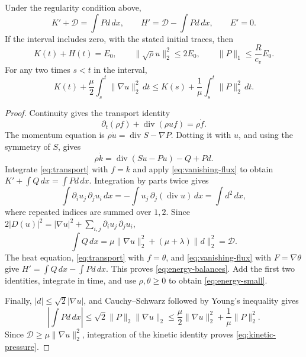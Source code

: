 \documentclass[10pt,twoside]{article}
\newcommand{\dd}{\,dx}
\newcommand{\dt}{\,dt}
\newcommand{\Div}{\operatorname{div}}
\newcommand{\norm}[2]{\lVert#1\rVert_{#2}}
\begin{document}
\begin{proposition}\label{prop:physical-energy}
Under the regularity condition above,
\begin{equation}\label{eq:energy-balances}
 K'+\mathcal D=\int Pd\dd,\qquad
 H'=\mathcal D-\int Pd\dd,\qquad E'=0.
\end{equation}
If the interval includes zero, with the stated initial traces, then
\begin{equation}\label{eq:energy-small}
 K(t)+H(t)=E_0,\qquad
 \norm{\sqrt\rho u}{2}^2\le2E_0,\qquad
 \norm{P}{1}\le\frac{R}{c_v}E_0.
\end{equation}
For any two times $s<t$ in the interval,
\begin{equation}\label{eq:kinetic-pressure}
 K(t)+\frac{\mu}{2}\int_s^t\norm{\nabla u}{2}^2\dt
 \le K(s)+\frac1\mu\int_s^t\norm{P}{2}^2\dt.
\end{equation}
\end{proposition}
\begin{proof}
Continuity gives the transport identity
\begin{equation}\label{eq:transport}
 \partial_t(\rho f)+\Div(\rho uf)=\rho\dot f.
\end{equation}
The momentum equation is $\rho\dot u=\Div S-\nabla P$.
Dotting it with $u$, and using the symmetry of $S$, gives
\begin{equation}\label{eq:kinetic-local}
 \rho\dot k=\Div(Su-Pu)-Q+Pd.
\end{equation}
Integrate \eqref{eq:transport} with $f=k$ and apply
\eqref{eq:vanishing-flux} to obtain $K'+\int Q\dd=\int Pd\dd$.
Integration by parts twice gives
\[
 \int\partial_i u_j\,\partial_j u_i\dd
 =-\int u_j\,\partial_j(\Div u)\dd=\int d^2\dd,
\]
where repeated indices are summed over $1,2$. Since
$2|D(u)|^2=|\nabla u|^2+\sum_{i,j}\partial_i u_j\,\partial_j u_i$,
\begin{equation}\label{eq:integrated-Q}
 \int Q\dd=\mu\norm{\nabla u}{2}^2
                 +(\mu+\lambda)\norm{d}{2}^2=\mathcal D.
\end{equation}
The heat equation, \eqref{eq:transport} with $f=\theta$, and
\eqref{eq:vanishing-flux} with $F=\nabla\theta$ give
$H'=\int Q\dd-\int Pd\dd$. This proves \eqref{eq:energy-balances}.
Add the first two identities, integrate in time, and use $\rho,\theta\ge0$
to obtain \eqref{eq:energy-small}.

Finally, $|d|\le\sqrt2|\nabla u|$, and Cauchy--Schwarz followed by
Young's inequality gives
\[
 \left|\int Pd\dd\right|
 \le\sqrt2\norm{P}{2}\norm{\nabla u}{2}
 \le\frac{\mu}{2}\norm{\nabla u}{2}^2+\frac1\mu\norm{P}{2}^2.
\]
Since $\mathcal D\ge\mu\norm{\nabla u}{2}^2$, integration of the
kinetic identity proves \eqref{eq:kinetic-pressure}.
\end{proof}
\end{document}
